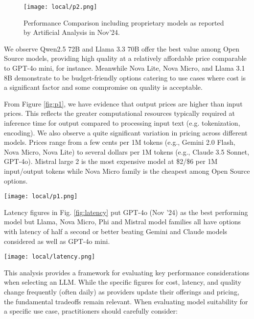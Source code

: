\begin{figure}[H]
\centering
\texttt{[image: local/p2.png]}
\caption{Performance Comparison including proprietary models as reported by Artificial Analysis in Nov'24.}
\label{fig:p2}
\end{figure}

We observe Qwen2.5 72B and Llama 3.3 70B offer the best value among Open Source models, providing high quality at a relatively affordable price comparable to GPT-4o mini, for instance. Meanwhile Nova Lite, Nova Micro, and Llama 3.1 8B demonstrate to be budget-friendly options catering to use cases where cost is a significant factor and some compromise on quality is acceptable.

From Figure \ref{fig:p1}, we have evidence that output prices are higher than input prices. This reflects the greater computational resources typically required at inference time for output compared to processing input text (e.g. tokenization, encoding). We also observe a quite significant variation in pricing across different models. Prices range from a few cents per 1M tokens (e.g., Gemini 2.0 Flash, Nova Micro, Nova Lite) to several dollars per 1M tokens (e.g., Claude 3.5 Sonnet, GPT-4o). Mistral large 2 is the most expensive model at \$2/\$6 per 1M input/output tokens while Nova Micro family is the cheapest among Open Source options.

\begin{figure*}[h!]
\centering
\texttt{[image: local/p1.png]}
\caption{Input and Output Prices Comparison as reported by Artificial Analysis in Nov'24.}
\label{fig:p1}
\end{figure*}

Latency figures in Fig. \ref{fig:latency} put GPT-4o (Nov '24) as the best performing model but Llama, Nova Micro, Phi and Mistral model families all have options with latency of half a second or better beating Gemini and Claude models considered as well as GPT-4o mini.

\begin{figure*}[h!]
\centering
\texttt{[image: local/latency.png]}
\caption{Latency Comparison as reported by Artificial Analysis in Nov'24.}
\label{fig:latency}
\end{figure*}

This analysis provides a framework for evaluating key performance considerations when selecting an LLM. While the specific figures for cost, latency, and quality change frequently (often daily) as providers update their offerings and pricing, the fundamental tradeoffs remain relevant. When evaluating model suitability for a specific use case, practitioners should carefully consider:

